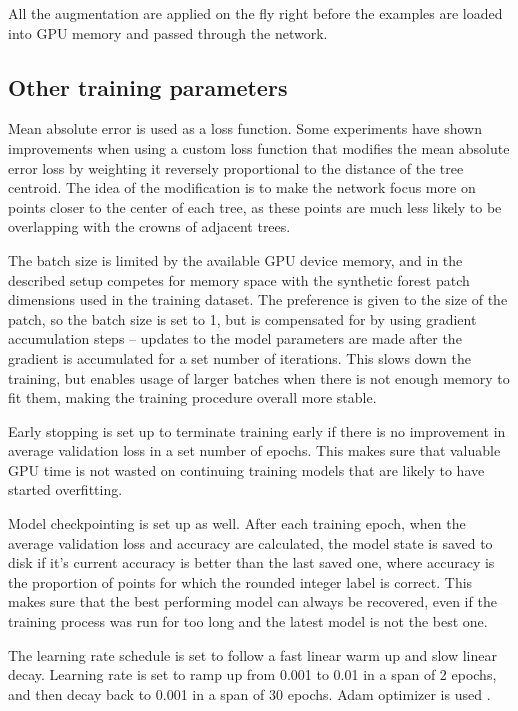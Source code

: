 All the augmentation are applied on the fly right before the examples are loaded into GPU memory and passed through the network.

\subsection{Other training parameters}\label{sec-other-training-params}

Mean absolute error is used as a loss function.
Some experiments have shown improvements when using a custom loss function that modifies the mean absolute error loss by weighting it reversely proportional to the distance of the tree centroid.
The idea of the modification is to make the network focus more on points closer to the center of each tree, as these points are much less likely to be overlapping with the crowns of adjacent trees.

The batch size is limited by the available GPU device memory, and in the described setup competes for memory space with the synthetic forest patch dimensions used in the training dataset.
The preference is given to the size of the patch, so the batch size is set to 1, but is compensated for by using gradient accumulation steps – updates to the model parameters are made after the gradient is accumulated for a set number of iterations.
This slows down the training, but enables usage of larger batches when there is not enough memory to fit them, making the training procedure overall more stable.

Early stopping \citep{precheltAutomaticEarlyStopping1998} is set up to terminate training early if there is no improvement in average validation loss in a set number of epochs.
This makes sure that valuable GPU time is not wasted on continuing training models that are likely to have started overfitting.

Model checkpointing is set up as well.
After each training epoch, when the average validation loss and accuracy are calculated, the model state is saved to disk if it's current accuracy is better than the last saved one, where accuracy is the proportion of points for which the rounded integer label is correct.
This makes sure that the best performing model can always be recovered, even if the training process was run for too long and the latest model is not the best one.

The learning rate schedule is set to follow a fast linear warm up and slow linear decay.
Learning rate is set to ramp up from 0.001 to 0.01 in a span of 2 epochs, and then decay back to 0.001 in a span of 30 epochs.
Adam optimizer is used \citep{kingmaAdamMethodStochastic2014}.

